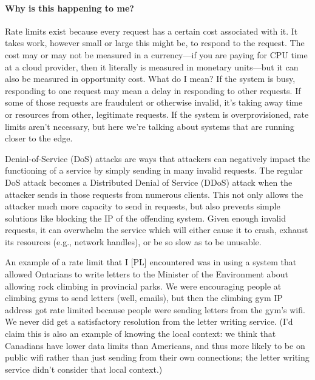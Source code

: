 \paragraph{Why is this happening to me?} Rate limits exist because every request has a certain cost associated with it. It takes work, however small or large this might be, to respond to the request. The cost may or may not be measured in a currency---if you are paying for CPU time at a cloud provider, then it literally is measured in monetary units---but it can also be measured in opportunity cost. What do I mean? If the system is busy, responding to one request may mean a delay in responding to other requests. If some of those requests are fraudulent or otherwise invalid, it's taking away time or resources from other, legitimate requests. If the system is overprovisioned, rate limits aren't necessary, but here we're talking about systems that are running closer to the edge.

Denial-of-Service (DoS) attacks are ways that attackers can negatively impact the functioning of a service by simply sending in many invalid requests. The regular DoS attack becomes a Distributed Denial of Service (DDoS) attack when the attacker sends in those requests from numerous clients. This not only allows the attacker much more capacity to send in requests, but also prevents simple solutions like blocking the IP of the offending system. Given enough invalid requests, it can overwhelm the service which will either cause it to crash, exhaust its resources (e.g., network handles), or be so slow as to be unusable.

An example of a rate limit that I [PL] encountered was in using a system that allowed Ontarians to write letters to the Minister of the Environment about allowing rock climbing in provincial parks. We were encouraging people at climbing gyms to send letters (well, emails), but then the climbing gym IP address got rate limited because people were sending letters from the gym's wifi. We never did get a satisfactory resolution from the letter writing service. (I'd claim this is also an example of knowing the local context: we think that Canadians have lower data limits than Americans, and thus more likely to be on public wifi rather than just sending from their own connections; the letter writing service didn't consider that local context.)

